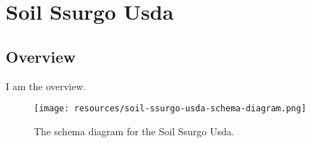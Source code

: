 
\section{Soil Ssurgo Usda}
\label{sec:soil-ssurgo-usda}
\subsection{Overview}
\label{ssec:overview}

I am the overview.

\begin{figure}[h!]
  \begin{center}
    \texttt{[image: resources/soil-ssurgo-usda-schema-diagram.png]}
  \end{center}
  \caption{The schema diagram for the Soil Ssurgo Usda.}
  \label{fig:ov-diagram}
\end{figure}


